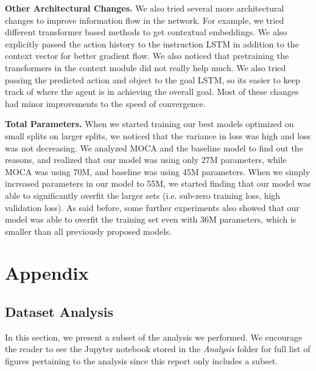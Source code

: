 \documentclass[11pt,a4paper]{article}
\begin{document}
\textbf{Other Architectural Changes.} We also tried several more architectural changes to improve information flow in the network. For example, we tried different transformer based methods to get contextual embeddings. We also explicitly passed the action history to the instruction LSTM in addition to the context vector for better gradient flow. We also noticed that pretraining the transformers in the context module did not really help much. We also tried passing the predicted action and object to the goal LSTM, so its easier to keep track of where the agent is in achieving the overall goal. Most of these changes had minor improvements to the speed of convergence.

\textbf{Total Parameters.} When we started training our best models optimized on small splits on larger splits, we noticed that the variance in loss was high and loss was not decreasing. We analyzed MOCA and the baseline model to find out the reasons, and realized that our model was using only 27M parameters, while MOCA was using 70M, and baseline was using 45M parameters. When we simply increased parameters in our model to 55M, we started finding that our model was able to significantly overfit the larger sets (i.e. sub-zero training loss, high validation loss). As said before, some further experiments also showed that our model was able to overfit the training set even with 36M parameters, which is smaller than all previously proposed models.






\appendix
\section{Appendix}

\subsection{Dataset Analysis}
In this section, we present a subset of the analysis we performed. We encourage the reader to see the Jupyter notebook stored in the \emph{Analysis} folder for full list of figures pertaining to the analysis since this report only includes a subset.
\end{document}
